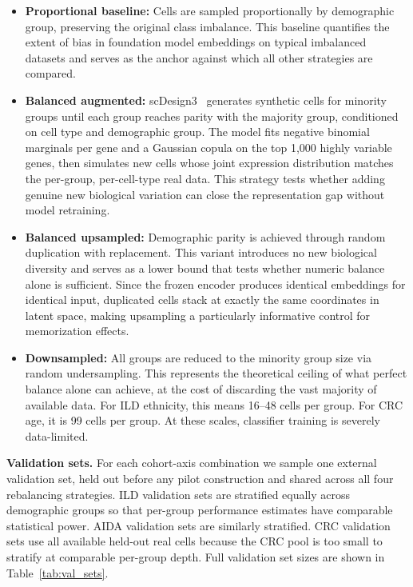 \documentclass[sigconf]{acmart}
\begin{document}
\begin{itemize}
    \item \textbf{Proportional baseline:} Cells are sampled proportionally 
    by demographic group, preserving the original class imbalance. This 
    baseline quantifies the extent of bias in foundation model embeddings on 
    typical imbalanced datasets and serves as the anchor against which all 
    other strategies are compared.

    \item \textbf{Balanced augmented:} scDesign3~\cite{song2023scdesign3} 
    generates synthetic cells for minority groups until each group reaches 
    parity with the majority group, conditioned on cell type and demographic 
    group. The model fits negative binomial marginals per gene and a Gaussian 
    copula on the top 1{,}000 highly variable genes, then simulates new cells 
    whose joint expression distribution matches the per-group, per-cell-type 
    real data. This strategy tests whether adding genuine new biological 
    variation can close the representation gap without model retraining.

    \item \textbf{Balanced upsampled:} Demographic parity is achieved through 
    random duplication with replacement. This variant introduces no new 
    biological diversity and serves as a lower bound that tests whether numeric 
    balance alone is sufficient. Since the frozen encoder produces identical 
    embeddings for identical input, duplicated cells stack at exactly the same 
    coordinates in latent space, making upsampling a particularly informative 
    control for memorization effects.

    \item \textbf{Downsampled:} All groups are reduced to the minority group 
    size via random undersampling. This represents the theoretical ceiling of 
    what perfect balance alone can achieve, at the cost of discarding the vast 
    majority of available data. For ILD ethnicity, this means 16--48 cells per 
    group. For CRC age, it is 99 cells per group. At these scales, classifier 
    training is severely data-limited.
\end{itemize}

\textbf{Validation sets.} For each cohort-axis combination we sample one 
external validation set, held out before any pilot construction and shared 
across all four rebalancing strategies. ILD validation sets are stratified 
equally across demographic groups so that per-group performance estimates have 
comparable statistical power. AIDA validation sets are similarly stratified. 
CRC validation sets use all available held-out real cells because the CRC pool 
is too small to stratify at comparable per-group depth. Full validation set 
sizes are shown in Table~\ref{tab:val_sets}.
\end{document}
